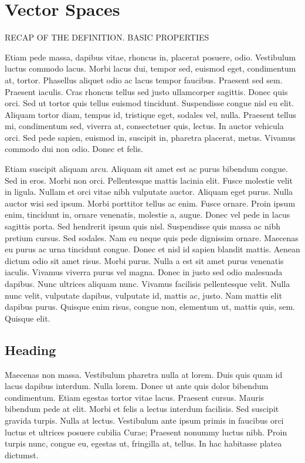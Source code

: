 \section{Vector Spaces}
RECAP OF THE DEFINITION. BASIC PROPERTIES

Etiam pede massa, dapibus vitae, rhoncus in, placerat posuere, odio. Vestibulum luctus
commodo lacus. Morbi lacus dui, tempor sed, euismod eget, condimentum at, tortor.
Phasellus aliquet odio ac lacus tempor faucibus. Praesent sed sem. Praesent iaculis. Cras
rhoncus tellus sed justo ullamcorper sagittis. Donec quis orci. Sed ut tortor quis tellus
euismod tincidunt. Suspendisse congue nisl eu elit. Aliquam tortor diam, tempus id, tristique
eget, sodales vel, nulla. Praesent tellus mi, condimentum sed, viverra at, consectetuer quis,
lectus. In auctor vehicula orci. Sed pede sapien, euismod in, suscipit in, pharetra placerat,
metus. Vivamus commodo dui non odio. Donec et felis.

Etiam suscipit aliquam arcu. Aliquam sit amet est ac purus bibendum congue. Sed in eros.
Morbi non orci. Pellentesque mattis lacinia elit. Fusce molestie velit in ligula. Nullam et
orci vitae nibh vulputate auctor. Aliquam eget purus. Nulla auctor wisi sed ipsum. Morbi
porttitor tellus ac enim. Fusce ornare. Proin ipsum enim, tincidunt in, ornare venenatis,
molestie a, augue. Donec vel pede in lacus sagittis porta. Sed hendrerit ipsum quis nisl.
Suspendisse quis massa ac nibh pretium cursus. Sed sodales. Nam eu neque quis pede
dignissim ornare. Maecenas eu purus ac urna tincidunt congue.
Donec et nisl id sapien blandit mattis. Aenean dictum odio sit amet risus. Morbi purus.
Nulla a est sit amet purus venenatis iaculis. Vivamus viverra purus vel magna. Donec in
justo sed odio malesuada dapibus. Nunc ultrices aliquam nunc. Vivamus facilisis pellentesque
velit. Nulla nunc velit, vulputate dapibus, vulputate id, mattis ac, justo. Nam mattis elit
dapibus purus. Quisque enim risus, congue non, elementum ut, mattis quis, sem. Quisque
elit.

\subsection{Heading}
Maecenas non massa. Vestibulum pharetra nulla at lorem. Duis quis quam id lacus dapibus
interdum. Nulla lorem. Donec ut ante quis dolor bibendum condimentum. Etiam egestas
tortor vitae lacus. Praesent cursus. Mauris bibendum pede at elit. Morbi et felis a lectus
interdum facilisis. Sed suscipit gravida turpis. Nulla at lectus. Vestibulum ante ipsum
primis in faucibus orci luctus et ultrices posuere cubilia Curae; Praesent nonummy luctus
nibh. Proin turpis nunc, congue eu, egestas ut, fringilla at, tellus. In hac habitasse platea
dictumst.

